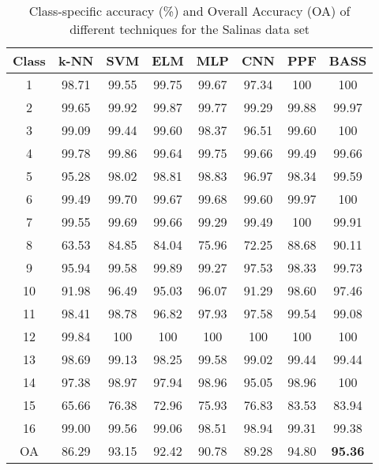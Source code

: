 \documentclass[journal]{IEEEtran}
\begin{document}
\begin{table}
\centering
\caption{Class-specific accuracy (\%) and Overall Accuracy (OA) of different techniques for the Salinas data set}
\label{table:Salinas_acc_comp}
\begin{tabular}{|c|c|c|c|c|c|c|c|}
\hline
Class & k-NN  & SVM   & ELM   & MLP   & CNN   & PPF   & BASS             \\ \hline
1     & 98.71 & 99.55 & 99.75 & 99.67 & 97.34 & 100   & 100              \\
2     & 99.65 & 99.92 & 99.87 & 99.77 & 99.29 & 99.88 & 99.97            \\
3     & 99.09 & 99.44 & 99.60 & 98.37 & 96.51 & 99.60 & 100              \\
4     & 99.78 & 99.86 & 99.64 & 99.75 & 99.66 & 99.49 & 99.66            \\
5     & 95.28 & 98.02 & 98.81 & 98.83 & 96.97 & 98.34 & 99.59            \\
6     & 99.49 & 99.70 & 99.67 & 99.68 & 99.60 & 99.97 & 100              \\
7     & 99.55 & 99.69 & 99.66 & 99.29 & 99.49 & 100   & 99.91            \\
8     & 63.53 & 84.85 & 84.04 & 75.96 & 72.25 & 88.68 & 90.11            \\
9     & 95.94 & 99.58 & 99.89 & 99.27 & 97.53 & 98.33 & 99.73            \\
10    & 91.98 & 96.49 & 95.03 & 96.07 & 91.29 & 98.60 & 97.46            \\
11    & 98.41 & 98.78 & 96.82 & 97.93 & 97.58 & 99.54 & 99.08            \\
12    & 99.84 & 100   & 100   & 100   & 100   & 100   & 100              \\
13    & 98.69 & 99.13 & 98.25 & 99.58 & 99.02 & 99.44 & 99.44            \\
14    & 97.38 & 98.97 & 97.94 & 98.96 & 95.05 & 98.96 & 100              \\
15    & 65.66 & 76.38 & 72.96 & 75.93 & 76.83 & 83.53 & 83.94            \\
16    & 99.00 & 99.56 & 99.06 & 98.51 & 98.94 & 99.31 & 99.38            \\ \hline
OA    & 86.29 & 93.15 & 92.42 & 90.78 & 89.28 & 94.80 & \textbf{95.36} \\ \hline
\end{tabular}
\end{table}
\end{document}
